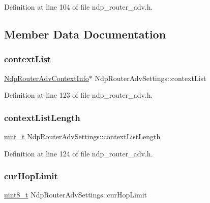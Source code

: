 Definition at line 104 of file ndp\+\_\+router\+\_\+adv.\+h.



\subsection{Member Data Documentation}
\mbox{\label{structNdpRouterAdvSettings_ae96fbd40e70dc52651cf9e6462cbf121}} 
\subsubsection{\texorpdfstring{context\+List}{contextList}}
{\footnotesize\ttfamily \hyperlink{structNdpRouterAdvContextInfo}{Ndp\+Router\+Adv\+Context\+Info}$\ast$ Ndp\+Router\+Adv\+Settings\+::context\+List}



Definition at line 123 of file ndp\+\_\+router\+\_\+adv.\+h.

\mbox{\label{structNdpRouterAdvSettings_ac4a679b32c25d5bc6d35b88f99cd0dcb}} 
\subsubsection{\texorpdfstring{context\+List\+Length}{contextListLength}}
{\footnotesize\ttfamily \hyperlink{compiler__port_8h_a12a1e9b3ce141648783a82445d02b58d}{uint\+\_\+t} Ndp\+Router\+Adv\+Settings\+::context\+List\+Length}



Definition at line 124 of file ndp\+\_\+router\+\_\+adv.\+h.

\mbox{\label{structNdpRouterAdvSettings_a779ad67d06dd54657953fad2d16c532d}} 
\subsubsection{\texorpdfstring{cur\+Hop\+Limit}{curHopLimit}}
{\footnotesize\ttfamily \hyperlink{stdint_8h_aba7bc1797add20fe3efdf37ced1182c5}{uint8\+\_\+t} Ndp\+Router\+Adv\+Settings\+::cur\+Hop\+Limit}



